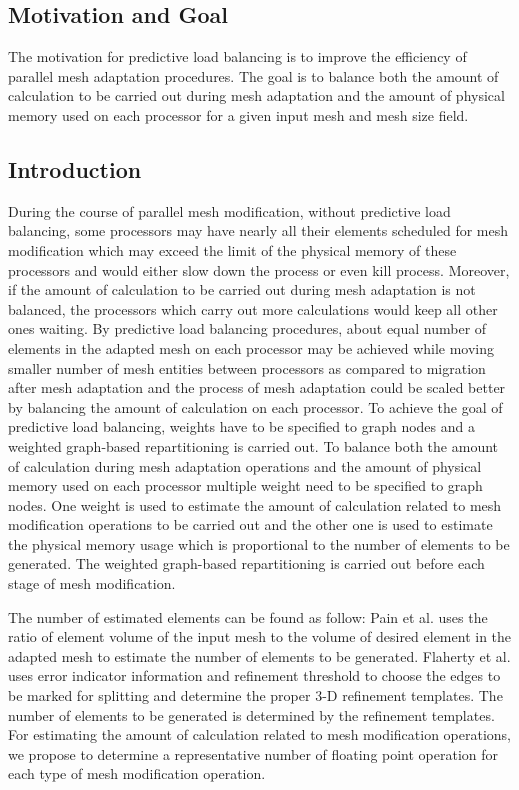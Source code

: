 
\subsection{Motivation and Goal}
The motivation for predictive load balancing is to improve the
efficiency of parallel mesh adaptation procedures. The goal is to
balance both the amount of calculation to be carried out during mesh
adaptation and the amount of physical memory used on each processor
for a given input mesh and mesh size field.
\subsection{Introduction}
During the course of parallel mesh modification, without predictive load
balancing, some processors may have nearly all their elements
scheduled for mesh modification which may exceed the limit of the physical memory of
these processors and would either slow down the process or even kill
process. Moreover, if the amount of calculation to be carried out
during mesh adaptation is not balanced, the processors which carry out
more calculations would keep all other ones waiting. By predictive load
balancing procedures, about equal number of elements in the adapted mesh
on each processor may be achieved while
moving smaller number of mesh entities between processors as compared to migration
after mesh adaptation and the process of mesh adaptation could be
scaled better by balancing the amount of calculation on each
processor. To achieve the goal of predictive load balancing, weights
have to be specified to graph nodes and a weighted graph-based
repartitioning is carried out. To balance both the amount of
calculation during mesh adaptation operations and the amount of
physical memory used on each processor multiple weight need to be
specified to graph nodes. One weight is used to estimate the amount of
calculation related to mesh modification operations to be carried out and the
other one is used to estimate the physical memory usage which is
proportional to the number of elements to be
generated. The weighted graph-based repartitioning is carried out before
each stage of mesh modification.

The number of estimated elements can be found as follow: Pain et al. \cite{Pain} uses the ratio of
element volume of the input mesh to the volume of desired element in
the adapted mesh to estimate the number of elements to be
generated. Flaherty et al. \cite{Flaherty} uses error indicator information and
refinement threshold to choose the edges to be marked for splitting
and determine the proper 3-D refinement templates. The number of
elements to be generated is determined by the refinement
templates. For estimating the amount of calculation related to mesh
modification operations, we propose to determine a representative
number of floating point operation for each type of mesh modification operation.
 
